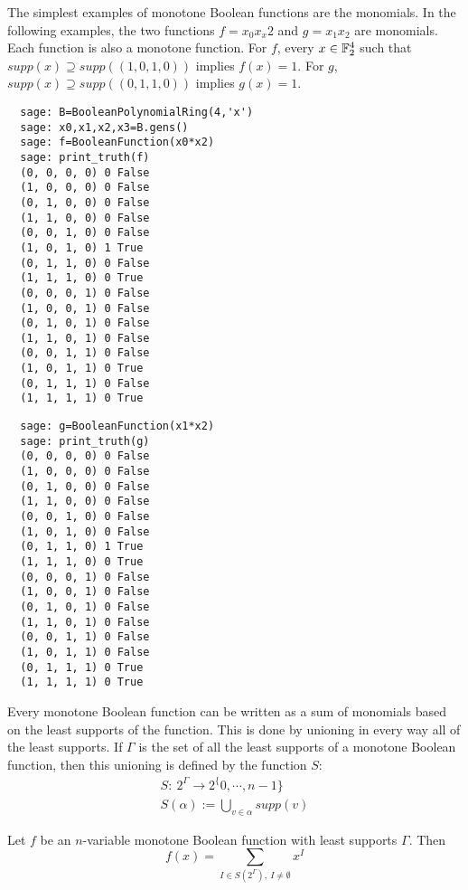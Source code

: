 \begin{example}
  The simplest examples of monotone Boolean functions are the monomials. In the
  following examples, the two functions $f=x_0x_x2$ and $g=x_1x_2$ are monomials.
  Each function is also a monotone function. For $f$, every $x\in\mathbb{F}_2^4$ such
  that $supp(x)\supseteq supp((1,0,1,0))$ implies $f(x)=1$. For $g$,
  $supp(x)\supseteq supp( (0,1,1,0) )$ implies $g(x)=1$.
  \begin{verbatim}
  sage: B=BooleanPolynomialRing(4,'x')
  sage: x0,x1,x2,x3=B.gens()
  sage: f=BooleanFunction(x0*x2)
  sage: print_truth(f)
  (0, 0, 0, 0) 0 False
  (1, 0, 0, 0) 0 False
  (0, 1, 0, 0) 0 False
  (1, 1, 0, 0) 0 False
  (0, 0, 1, 0) 0 False
  (1, 0, 1, 0) 1 True
  (0, 1, 1, 0) 0 False
  (1, 1, 1, 0) 0 True
  (0, 0, 0, 1) 0 False
  (1, 0, 0, 1) 0 False
  (0, 1, 0, 1) 0 False
  (1, 1, 0, 1) 0 False
  (0, 0, 1, 1) 0 False
  (1, 0, 1, 1) 0 True
  (0, 1, 1, 1) 0 False
  (1, 1, 1, 1) 0 True
  \end{verbatim}

  \begin{verbatim}
  sage: g=BooleanFunction(x1*x2)
  sage: print_truth(g)
  (0, 0, 0, 0) 0 False
  (1, 0, 0, 0) 0 False
  (0, 1, 0, 0) 0 False
  (1, 1, 0, 0) 0 False
  (0, 0, 1, 0) 0 False
  (1, 0, 1, 0) 0 False
  (0, 1, 1, 0) 1 True
  (1, 1, 1, 0) 0 True
  (0, 0, 0, 1) 0 False
  (1, 0, 0, 1) 0 False
  (0, 1, 0, 1) 0 False
  (1, 1, 0, 1) 0 False
  (0, 0, 1, 1) 0 False
  (1, 0, 1, 1) 0 False
  (0, 1, 1, 1) 0 True
  (1, 1, 1, 1) 0 True
  \end{verbatim}
\end{example}

\par Every monotone Boolean function can be written as a sum of monomials
based on the least supports of the function. This is done by unioning in
every way all of the least supports. If $\Gamma$ is the set of all the least
supports of a monotone Boolean function, then this unioning is defined by
the function $S$:
\begin{align}
  S:\ 2^\Gamma \rightarrow 2^\{0,\cdots,n-1\} \\
  S(\alpha):=\bigcup_{v\in\alpha}supp(v)
\end{align}

\begin{theorem}
  Let $f$ be an $n$-variable monotone Boolean function with least supports
  $\Gamma$. Then
  \begin{equation}
    f(x)=\sum_{I\in S(2^\Gamma),\ I\not=\emptyset} x^I
  \end{equation}
\end{theorem}

